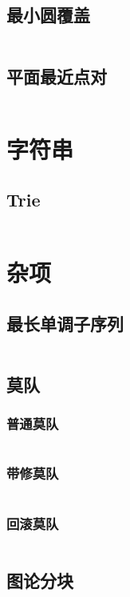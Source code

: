 \documentclass[utf8]{ctexart}
\newcommand{\cpp}[1]{\inputminted[linenos,breaklines,tabsize=4,mathescape]{c++}{#1}}
\begin{document}
\subsection{最小圆覆盖}
\cpp{codes/computational-geometry/min-circle-cover.cpp}

\subsection{平面最近点对}
\cpp{codes/computational-geometry/nearest-points.cpp}

\section{字符串}

\subsection{Trie}
\cpp{codes/string/trie.cpp}

\section{杂项}

\subsection{最长单调子序列}
\cpp{codes/misc/lis.cpp}

\subsection{莫队}

\subsubsection{普通莫队}
\cpp{codes/misc/mo.cpp}

\subsubsection{带修莫队}
\cpp{codes/misc/modifiable-mo.cpp}

\subsubsection{回滚莫队}
\cpp{codes/misc/rollback-mo.cpp}

\subsection{图论分块}
\cpp{codes/misc/graph-block.cpp}
\end{document}
